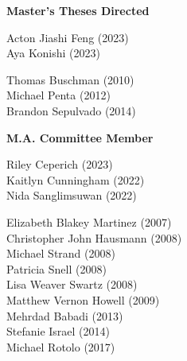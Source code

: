 
\noindent \textbf{Master's Theses Directed}

    \begin{multicols}{2}
    \noindent
    Acton Jiashi Feng (2023) \\
    Aya Konishi (2023)  \\ 	
\end{multicols}

    \begin{multicols}{2}
    \noindent
    Thomas Buschman (2010) \\
    Michael Penta (2012)  \\ 	
    Brandon Sepulvado (2014)
\end{multicols}

\noindent \textbf{M.A. Committee Member}  

\begin{multicols}{2}
    \noindent
    Riley Ceperich (2023) \\
    Kaitlyn Cunningham (2022) \\
    Nida Sanglimsuwan (2022) 
\end{multicols}

\medskip
{}
\begin{multicols}{2}
    \noindent
    Elizabeth Blakey Martinez (2007) \\
    Christopher John Hausmann (2008) \\
    Michael Strand (2008) \\
    Patricia Snell (2008) \\
    Lisa Weaver Swartz (2008) \\
    Matthew Vernon Howell (2009) \\
    Mehrdad Babadi (2013) \\
    Stefanie Israel (2014) \\
    Michael Rotolo (2017)
\end{multicols}